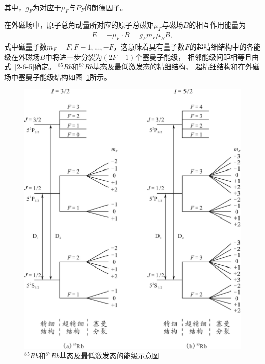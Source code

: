 \documentclass[11pt,a4paper]{article}
\begin{document}
\begin{spacing}{1.3}
\begin{CJK*}{UTF8}{gbsn}
\begin{eqnarray}
\end{eqnarray}
其中，$g_F$为对应于$\mu_F$与$P_F$的朗德因子。\par
  在外磁场中，原子总角动量所对应的原子总磁矩$\mu_F$与磁场$B$的相互作用能量为
  \begin{eqnarray} \label{2-6-5}
  E= -\mu_F\cdot B=g_Fm_F\mu_BB,
\end{eqnarray}
式中磁量子数$m_F=F,F-1,...,-F$，这意味着具有量子数$F$的超精细结构中的各能级在外磁场$B$中将进一步分裂为$(2F+1)$个塞曼子能级，
相邻能级间距相等且由式~\eqref{2-6-5}确定。 $^{85}Rb$和$^{87}Rb$基态及最低激发态的精细结构、
超精细结构和在外磁场中塞曼子能级结构如图~\ref{fig2-6-1}所示。
\begin{figure}[h!]
\centering
\includegraphics[width=.6\textwidth]{fig2-6-1}
\caption{$^{85}Rb$和$^{87}Rb$基态及最低激发态的能级示意图}
\label{fig2-6-1}
\end{figure} 


\end{CJK*}
\end{spacing}
\end{document}
